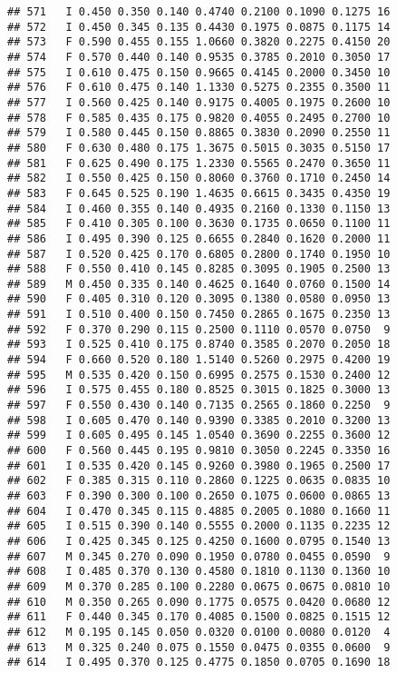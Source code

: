 \documentclass[
]{article}
\begin{document}
\begin{verbatim}
## 571   I 0.450 0.350 0.140 0.4740 0.2100 0.1090 0.1275 16
## 572   I 0.450 0.345 0.135 0.4430 0.1975 0.0875 0.1175 14
## 573   F 0.590 0.455 0.155 1.0660 0.3820 0.2275 0.4150 20
## 574   F 0.570 0.440 0.140 0.9535 0.3785 0.2010 0.3050 17
## 575   I 0.610 0.475 0.150 0.9665 0.4145 0.2000 0.3450 10
## 576   F 0.610 0.475 0.140 1.1330 0.5275 0.2355 0.3500 11
## 577   I 0.560 0.425 0.140 0.9175 0.4005 0.1975 0.2600 10
## 578   F 0.585 0.435 0.175 0.9820 0.4055 0.2495 0.2700 10
## 579   I 0.580 0.445 0.150 0.8865 0.3830 0.2090 0.2550 11
## 580   F 0.630 0.480 0.175 1.3675 0.5015 0.3035 0.5150 17
## 581   F 0.625 0.490 0.175 1.2330 0.5565 0.2470 0.3650 11
## 582   I 0.550 0.425 0.150 0.8060 0.3760 0.1710 0.2450 14
## 583   F 0.645 0.525 0.190 1.4635 0.6615 0.3435 0.4350 19
## 584   I 0.460 0.355 0.140 0.4935 0.2160 0.1330 0.1150 13
## 585   F 0.410 0.305 0.100 0.3630 0.1735 0.0650 0.1100 11
## 586   I 0.495 0.390 0.125 0.6655 0.2840 0.1620 0.2000 11
## 587   I 0.520 0.425 0.170 0.6805 0.2800 0.1740 0.1950 10
## 588   F 0.550 0.410 0.145 0.8285 0.3095 0.1905 0.2500 13
## 589   M 0.450 0.335 0.140 0.4625 0.1640 0.0760 0.1500 14
## 590   F 0.405 0.310 0.120 0.3095 0.1380 0.0580 0.0950 13
## 591   I 0.510 0.400 0.150 0.7450 0.2865 0.1675 0.2350 13
## 592   F 0.370 0.290 0.115 0.2500 0.1110 0.0570 0.0750  9
## 593   I 0.525 0.410 0.175 0.8740 0.3585 0.2070 0.2050 18
## 594   F 0.660 0.520 0.180 1.5140 0.5260 0.2975 0.4200 19
## 595   M 0.535 0.420 0.150 0.6995 0.2575 0.1530 0.2400 12
## 596   I 0.575 0.455 0.180 0.8525 0.3015 0.1825 0.3000 13
## 597   F 0.550 0.430 0.140 0.7135 0.2565 0.1860 0.2250  9
## 598   I 0.605 0.470 0.140 0.9390 0.3385 0.2010 0.3200 13
## 599   I 0.605 0.495 0.145 1.0540 0.3690 0.2255 0.3600 12
## 600   F 0.560 0.445 0.195 0.9810 0.3050 0.2245 0.3350 16
## 601   I 0.535 0.420 0.145 0.9260 0.3980 0.1965 0.2500 17
## 602   F 0.385 0.315 0.110 0.2860 0.1225 0.0635 0.0835 10
## 603   F 0.390 0.300 0.100 0.2650 0.1075 0.0600 0.0865 13
## 604   I 0.470 0.345 0.115 0.4885 0.2005 0.1080 0.1660 11
## 605   I 0.515 0.390 0.140 0.5555 0.2000 0.1135 0.2235 12
## 606   I 0.425 0.345 0.125 0.4250 0.1600 0.0795 0.1540 13
## 607   M 0.345 0.270 0.090 0.1950 0.0780 0.0455 0.0590  9
## 608   I 0.485 0.370 0.130 0.4580 0.1810 0.1130 0.1360 10
## 609   M 0.370 0.285 0.100 0.2280 0.0675 0.0675 0.0810 10
## 610   M 0.350 0.265 0.090 0.1775 0.0575 0.0420 0.0680 12
## 611   F 0.440 0.345 0.170 0.4085 0.1500 0.0825 0.1515 12
## 612   M 0.195 0.145 0.050 0.0320 0.0100 0.0080 0.0120  4
## 613   M 0.325 0.240 0.075 0.1550 0.0475 0.0355 0.0600  9
## 614   I 0.495 0.370 0.125 0.4775 0.1850 0.0705 0.1690 18

\end{verbatim}
\end{document}
